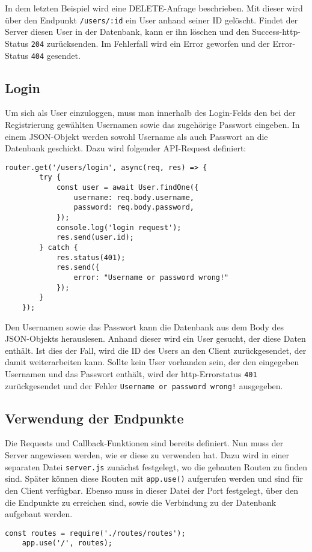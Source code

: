 In dem letzten Beispiel wird eine DELETE-Anfrage beschrieben. Mit dieser wird über den Endpunkt \texttt{/users/:id} ein User anhand seiner ID gelöscht. Findet der Server diesen User in der Datenbank, kann er ihn löschen und den Success-http-Status \texttt{204} zurücksenden. Im Fehlerfall wird ein Error geworfen und der Error-Status \texttt{404} gesendet.

\subsection{Login}
Um sich als User einzuloggen, muss man innerhalb des Login-Felds den bei der Registrierung gewählten Usernamen sowie das zugehörige Passwort eingeben. In einem JSON-Objekt werden sowohl Username als auch Passwort an die Datenbank geschickt. Dazu wird folgender API-Request definiert:

\begin{lstlisting}[caption=Login-Request, label=lst:loginrequest,float=!htb]
    router.get('/users/login', async(req, res) => {
        try {
            const user = await User.findOne({ 
                username: req.body.username,
                password: req.body.password,
            });
            console.log('login request');
            res.send(user.id);
        } catch {
            res.status(401);
            res.send({
                error: "Username or password wrong!"
            });
        }
    });
\end{lstlisting}

Den Usernamen sowie das Passwort kann die Datenbank aus dem Body des JSON-Objekts herauslesen. Anhand dieser wird ein User gesucht, der diese Daten enthält. Ist dies der Fall, wird die ID des Users an den Client zurückgesendet, der damit weiterarbeiten kann. Sollte kein User vorhanden sein, der den eingegeben Usernamen und das Passwort enthält, wird der http-Errorstatus \texttt{401} zurückgesendet und der Fehler \texttt{Username or password wrong!} ausgegeben.

\subsection{Verwendung der Endpunkte}
Die Requests und Callback-Funktionen sind bereits definiert. Nun muss der Server angewiesen werden, wie er diese zu verwenden hat. Dazu wird in einer separaten Datei \texttt{server.js} zunächst festgelegt, wo die gebauten Routen zu finden sind. Später können diese Routen mit \texttt{app.use()} aufgerufen werden und sind für den Client verfügbar. Ebenso muss in dieser Datei der Port festgelegt, über den die Endpunkte zu erreichen sind, sowie die Verbindung zu der Datenbank aufgebaut werden.

\begin{lstlisting}[caption=Verwendung der API-Routen, label=lst:apiroutenverwendung,float=!htb] 
    const routes = require('./routes/routes');
    app.use('/', routes);
\end{lstlisting}
